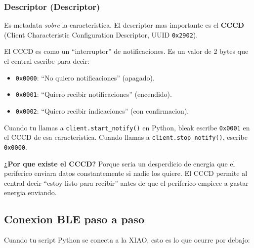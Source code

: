 \documentclass[11pt,a4paper]{article}
\begin{document}
\subsubsection{Descriptor (Descriptor)}

Es metadata \emph{sobre} la caracteristica. El descriptor mas
importante es el \textbf{CCCD} (Client Characteristic Configuration
Descriptor, UUID \texttt{0x2902}).

El CCCD es como un ``interruptor'' de notificaciones. Es un valor
de 2 bytes que el central escribe para decir:

\begin{itemize}
    \item \texttt{0x0000}: ``No quiero notificaciones''
          (apagado).
    \item \texttt{0x0001}: ``Quiero recibir notificaciones''
          (encendido).
    \item \texttt{0x0002}: ``Quiero recibir indicaciones''
          (con confirmacion).
\end{itemize}

Cuando tu llamas a \texttt{client.start\_notify()} en Python, bleak
escribe \texttt{0x0001} en el CCCD de esa caracteristica. Cuando
llamas a \texttt{client.stop\_notify()}, escribe \texttt{0x0000}.

\textbf{¿Por que existe el CCCD?} Porque seria un desperdicio de
energia que el periferico enviara datos constantemente si nadie los
quiere. El CCCD permite al central decir ``estoy listo para
recibir'' antes de que el periferico empiece a gastar energia
enviando.

\subsection{Conexion BLE paso a paso}

Cuando tu script Python se conecta a la XIAO, esto es lo que ocurre
por debajo:
\end{document}
